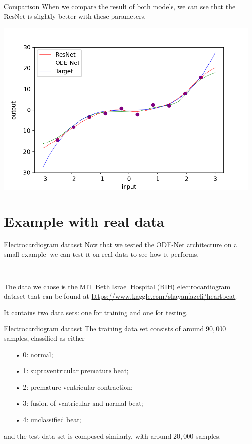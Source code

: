 \documentclass[11pt]{beamer}
\begin{document}
\begin{frame}{Comparison}
When we compare the result of both models, we can see that the ResNet is slightly better with these parameters.
\begin{center}
\includegraphics[scale=0.45]{comparaison_final.png}
\end{center}
\end{frame}

\section{Example with real data}
\begin{frame}{Electrocardiogram dataset}
Now that we tested the ODE-Net architecture on a small example, we can test it on real data to see how it performs.

~

The data we chose is the MIT Beth Israel Hospital (BIH) electrocardiogram dataset that can be found at \url{https://www.kaggle.com/shayanfazeli/heartbeat}. 

It contains two data sets: one for training and one for testing.
\end{frame}

\begin{frame}{Electrocardiogram dataset}
The training data set consists of around $90,000$ samples, classified as either
\begin{itemize}
\item[•] 0: normal;
\item[•] 1: supraventricular premature beat;
\item[•] 2: premature ventricular contraction;
\item[•] 3: fusion of ventricular and normal beat;
\item[•] 4: unclassified beat;
\end{itemize}
and the test data set is composed similarly, with around $20,000$ samples.
\end{frame}
\end{document}
